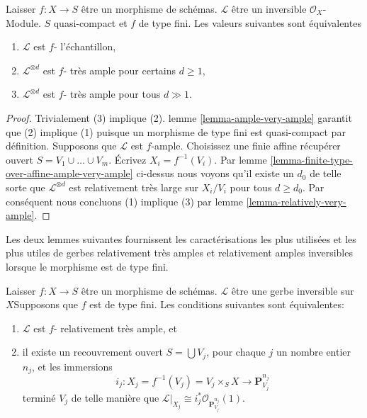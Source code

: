 \begin{lemma}

\label{lemma-finite-type-ample-very-ample}

Laisser $f : X \to S$ être un morphisme de schémas. $\mathcal{L}$ être un inversible $\mathcal{O}_X$- Module. $S$ quasi-compact et $f$ de type fini. Les valeurs suivantes sont équivalentes

\begin{enumerate}

\item  $\mathcal{L}$ est $f$- l'échantillon,
\item  $\mathcal{L}^{\otimes d}$ est $f$- très ample pour certains $d \geq 1$,
\item  $\mathcal{L}^{\otimes d}$ est $f$- très ample pour tous $d \gg 1$.

\end{enumerate}

\end{lemma}

\begin{proof}
Trivialement (3) implique (2). lemme \ref{lemma-ample-very-ample} garantit que (2) implique (1) puisque un morphisme de type fini est quasi-compact par définition. Supposons que $\mathcal{L}$ est $f$-ample. Choisissez une finie affine récupérer ouvert $S = V_1 \cup \ldots \cup V_m$. Écrivez $X_i = f^{-1}(V_i)$. Par lemme \ref{lemma-finite-type-over-affine-ample-very-ample} ci-dessus nous voyons qu'il existe un $d_0$ de telle sorte que $\mathcal{L}^{\otimes d}$ est relativement très large sur $X_i/V_i$ pour tous $d \geq d_0$. Par conséquent nous concluons (1) implique (3) par lemme \ref{lemma-relatively-very-ample}.
\end{proof}

\noindent
Les deux lemmes suivantes fournissent les caractérisations les plus utilisées et les plus utiles de gerbes relativement très amples et relativement amples inversibles lorsque le morphisme est de type fini.

\begin{lemma}

\label{lemma-characterize-very-ample-on-finite-type}

Laisser $f : X \to S$ être un morphisme de schémas. $\mathcal{L}$ être une gerbe inversible sur $X$Supposons que $f$ est de type fini. Les conditions suivantes sont équivalentes:

\begin{enumerate}

\item  $\mathcal{L}$ est $f$- relativement très ample, et
\item il existe un recouvrement ouvert $S = \bigcup V_j$, pour chaque $j$ un nombre entier $n_j$, et les immersions
$$
i_j :
X_j = f^{-1}(V_j) = V_j \times_S X
\longrightarrow
\mathbf{P}^{n_j}_{V_j}
$$
terminé $V_j$ de telle manière que
$\mathcal{L}|_{X_j} \cong i_j^*\mathcal{O}_{\mathbf{P}^{n_j}_{V_j}}(1)$.

\end{enumerate}

\end{lemma}

